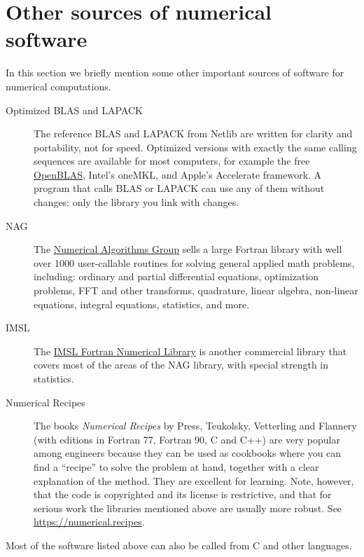 \section{Other sources of numerical software}

In this section we briefly mention some other important sources of software for numerical computations.

\begin{description}
    \item[Optimized BLAS and LAPACK] The reference BLAS and LAPACK from Netlib are written for clarity and portability, not for speed. Optimized versions with exactly the same calling sequences are available for most computers, for example the free \href{https://www.openblas.net}{OpenBLAS}, Intel's oneMKL, and Apple's Accelerate framework. A program that calls BLAS or LAPACK can use any of them without changes: only the library you link with changes.
    \item[NAG] The \href{https://nag.com}{Numerical Algorithms Group} sells a large Fortran library with well over 1000 user-callable routines for solving general applied math problems, including: ordinary and partial differential equations, optimization problems, FFT and other transforms, quadrature, linear algebra, non-linear equations, integral equations, statistics, and more.
    \item[IMSL] The \href{https://www.imsl.com}{IMSL Fortran Numerical Library} is another commercial library that covers most of the areas of the NAG library, with special strength in statistics.
    \item[Numerical Recipes] The books \emph{Numerical Recipes} by Press, Teukolsky, Vetterling and Flannery (with editions in Fortran 77, Fortran 90, C and C++) are very popular among engineers because they can be used as cookbooks where you can find a ``recipe'' to solve the problem at hand, together with a clear explanation of the method. They are excellent for learning. Note, however, that the code is copyrighted and its license is restrictive, and that for serious work the libraries mentioned above are usually more robust. See \url{https://numerical.recipes}.
\end{description}

Most of the software listed above can also be called from C and other languages.
